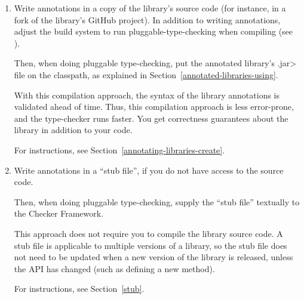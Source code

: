 \begin{enumerate}
\item
  Write annotations in a copy of the library's source code (for instance,
  in a fork of the library's GitHub project).  In addition to writing
  annotations, adjust the build system to run pluggable-type-checking when
  compiling (see ).

  Then, when doing pluggable type-checking,
  put the annotated library's \<.jar> file on the classpath, as explained in
  Section~\ref{annotated-libraries-using}.


  With this compilation approach, the syntax of the library annotations is
  validated ahead of time.  Thus, this compilation approach is less
  error-prone, and the type-checker runs faster.  You get
  correctness guarantees about the library in addition to your code.

  For instructions, see Section~\ref{annotating-libraries-create}.

\item
  Write annotations in a ``stub file'', if you do not have access to the
  source code.

  Then, when doing pluggable type-checking,
  supply the ``stub file'' textually to the Checker Framework.

  This approach does not require you to compile the library source
  code.
  A stub file is applicable to multiple versions of a library, so
  the stub file does not need to be updated when a new version of the
  library is released, unless the API has changed (such as defining a new
  method).

  For instructions, see Section~\ref{stub}.

\end{enumerate}


